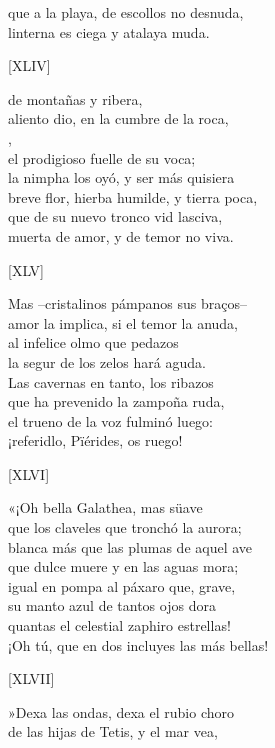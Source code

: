 \documentclass[11pt,a4paper,twoside]{article}
\begin{document}
que a la playa, de escollos no desnuda,\\
linterna es ciega y atalaya muda.\pend
\begin{center}
	[XLIV]
\end{center}\pstart
{} de montañas y ribera,\\
aliento dio, en la cumbre de la roca,\\
,\\
el prodigioso fuelle de su voca;\\
la nimpha los oyó, y ser más quisiera\\
breve flor, hierba humilde, y tierra poca,\\
que de su nuevo tronco vid lasciva,\\
muerta de amor, y de temor no viva.\pend
\begin{center}
	[XLV]
\end{center}\pstart
Mas --cristalinos pámpanos sus braços--\\
amor la implica, si el temor la anuda,\\
al infelice olmo que pedazos\\
la segur de los zelos hará aguda.\\
Las cavernas en tanto, los ribazos\\
que ha prevenido la zampoña ruda,\\
el trueno de la voz fulminó luego:\\
¡referidlo, Pïérides, os ruego!\pend
\begin{center}
	[XLVI]
\end{center}\pstart
«¡Oh bella Galathea, mas süave\\
que los claveles que tronchó la aurora;\\
blanca más que las plumas de aquel ave\\
que dulce muere y en las aguas mora;\\
igual en pompa al páxaro que, grave,\\
su manto azul de tantos ojos dora\\
quantas el celestial zaphiro estrellas!\\
¡Oh tú, que en dos incluyes las más bellas!\pend
\begin{center}
	[XLVII]
\end{center}\pstart
»Dexa las ondas, dexa el rubio choro\\
de las hijas de Tetis, y el mar vea,\\
\end{document}
